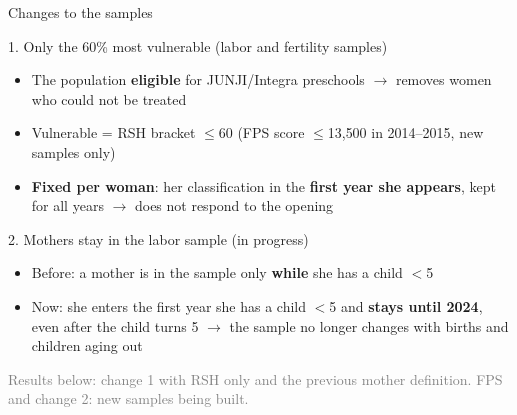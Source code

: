 \documentclass[aspectratio=169,10pt]{beamer}
\newcommand{\fuente}[1]{\vspace{2pt}\textcolor{graytext}{\scriptsize #1}}
\newcommand{\takeaway}[1]{\par\vspace{6pt}{\small\textcolor{steel}{$\Rightarrow$}\ \textbf{\textcolor{navy}{#1}}}}
\begin{document}
\begin{frame}[label=changes]{Changes to the samples}
\begin{block}{1. Only the 60\% most vulnerable (labor and fertility samples)}
\footnotesize
\begin{itemize}
  \item The population \textbf{eligible} for JUNJI/Integra preschools $\to$ removes women who could not be treated
  \item Vulnerable = RSH bracket $\leq$60 (FPS score $\leq$13{,}500 in 2014--2015, new samples only)
  \item \textbf{Fixed per woman}: her classification in the \textbf{first year she appears}, kept for all years $\to$ does not respond to the opening
\end{itemize}
\end{block}
\vspace{2pt}
\begin{block}{2. Mothers stay in the labor sample (in progress)}
\footnotesize
\begin{itemize}
  \item Before: a mother is in the sample only \textbf{while} she has a child $<$5
  \item Now: she enters the first year she has a child $<$5 and \textbf{stays until 2024}, even after the child turns 5 $\to$ the sample no longer changes with births and children aging out
\end{itemize}
\end{block}
\takeaway{We now focus on eligible mothers and follow the same mothers over time.}
\par\fuente{Results below: change 1 with RSH only and the previous mother definition. FPS and change 2: new samples being built.}
\end{frame}
\end{document}
